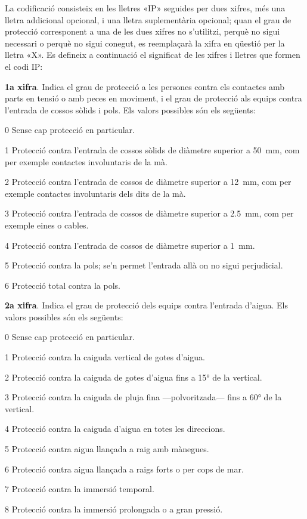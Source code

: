 La codificació consisteix en les lletres «IP»
seguides per dues xifres, més una lletra addicional opcional, i una
lletra suplementària opcional; quan el grau de protecció
corresponent a una de les dues xifres no s'utilitzi, perquè no sigui
necessari o perquè no sigui conegut, es reemplaçarà la xifra en
qüestió per la lletra «X». Es defineix a continuació el
significat de les xifres i lletres que formen el codi IP:

\textbf{1a xifra}. Indica el grau de protecció a les persones contra els contactes amb
parts en tensió o amb peces en moviment, i el grau de protecció als equips contra l'entrada de cossos sòlids i pols. Els valors possibles són els següents:
\begin{list}{}
   {\setlength{\labelwidth}{10mm} \setlength{\leftmargin}{15mm} \setlength{\labelsep}{5mm}}
   \item[0] Sense cap protecció en particular.
   \item[1]Protecció contra l'entrada de cossos sòlids de diàmetre superior a \qty{50}{mm},
   com per exemple   contactes involuntaris de la mà.
   \item[2] Protecció contra l'entrada de cossos de diàmetre superior a \qty{12}{mm}, com per exemple
   contactes involuntaris dels dits de la mà.
   \item[3] Protecció contra l'entrada de cossos de diàmetre superior a \qty{2,5}{mm},
   com per exemple eines o cables.
   \item[4] Protecció contra l'entrada de cossos de diàmetre superior a \qty{1}{mm}.
   \item[5] Protecció contra la pols; se'n permet l'entrada allà on no sigui perjudicial.
   \item[6] Protecció total contra la pols.
\end{list}

\textbf{2a xifra}. Indica el grau de protecció dels equips contra
l'entrada d'aigua. Els valors possibles són els següents:
\begin{list}{}
   {\setlength{\labelwidth}{10mm} \setlength{\leftmargin}{15mm} \setlength{\labelsep}{5mm}}
   \item[0] Sense cap protecció en particular.
   \item[1] Protecció contra la caiguda vertical de gotes d'aigua.
   \item[2] Protecció contra la caiguda de gotes d'aigua fins a \ang{15} de la  vertical.
   \item[3] Protecció contra la caiguda de pluja fina ---polvoritzada--- fins a \ang{60} de la  vertical.
   \item[4] Protecció contra la caiguda d'aigua en totes les direccions.
   \item[5] Protecció contra aigua llançada a raig amb mànegues.
   \item[6] Protecció contra aigua llançada a raigs forts o per cops de mar.
   \item[7] Protecció contra la immersió temporal.
   \item[8] Protecció contra la immersió prolongada o a gran pressió.
\end{list}


